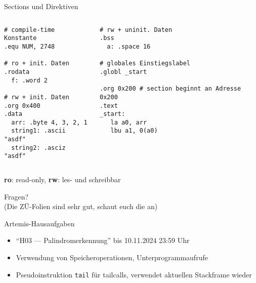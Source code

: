 \documentclass[
  german,            %
  aspectratio=169,    %
]{tumbeamer}
\begin{document}
\begin{frame}[c, fragile]{Sections und Direktiven}
  \begin{columns}[c]
    \begin{column}{0.45\textwidth}
      \begin{verbatim}
# compile-time Konstante
.equ NUM, 2748 

# ro + init. Daten
.rodata
  f: .word 2

# rw + init. Daten
.org 0x400
.data
  arr: .byte 4, 3, 2, 1
  string1: .ascii "asdf"
  string2: .asciz "asdf"
        \end{verbatim}
    \end{column}
    \begin{column}{0.45\textwidth}
      \begin{verbatim}
# rw + uninit. Daten
.bss
  a: .space 16

# globales Einstiegslabel
.globl _start

.org 0x200 # section beginnt an Adresse 0x200
.text
_start:
   la a0, arr
   lbu a1, 0(a0)
      \end{verbatim}
    \end{column}
  \end{columns}
  \begin{center}
  \small{\textbf{ro}: read-only, \textbf{rw}: les- und schreibbar}
  \end{center}
\end{frame}


\begin{frame}[c]{}{}
  \begin{center}
    \LARGE Fragen?\\
    \Large (Die ZÜ-Folien sind sehr gut, schaut euch die an)
  \end{center}
\end{frame}

\begin{frame}[c, fragile]{Artemis-Hausaufgaben}{}
  \begin{itemize}
    \item \enquote{H03 --- Palindromerkennung} bis 10.11.2024 23:59 Uhr
    \item Verwendung von Speicheroperationen, Unterprogrammaufrufe
    \item Pseudoinstruktion \verb|tail| für tailcalls, verwendet aktuellen Stackframe wieder
  \end{itemize}
\end{frame}
\end{document}
